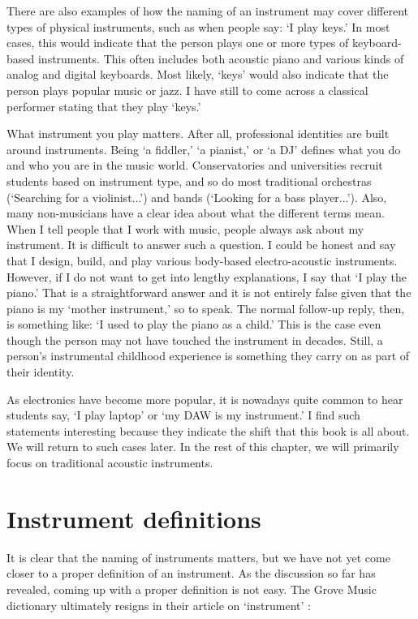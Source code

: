 There are also examples of how the naming of an instrument may cover different types of physical instruments, such as when people say: `I play keys.' In most cases, this would indicate that the person plays one or more types of keyboard-based instruments. This often includes both acoustic piano and various kinds of analog and digital keyboards. Most likely, `keys' would also indicate that the person plays popular music or jazz. I have still to come across a classical performer stating that they play `keys.'

What instrument you play matters. After all, professional identities are built around instruments. Being `a fiddler,' `a pianist,' or `a DJ' defines what you do and who you are in the music world. Conservatories and universities recruit students based on instrument type, and so do most traditional orchestras (`Searching for a violinist...') and bands (`Looking for a bass player...'). Also, many non-musicians have a clear idea about what the different terms mean.
When I tell people that I work with music, people always ask about my instrument. It is difficult to answer such a question. I could be honest and say that I design, build, and play various body-based electro-acoustic instruments. However, if I do not want to get into lengthy explanations, I say that `I play the piano.' That is a straightforward answer and it is not entirely false given that the piano is my `mother instrument,' so to speak. The normal follow-up reply, then, is something like: `I used to play the piano as a child.' This is the case even though the person may not have touched the instrument in decades. Still, a person's instrumental childhood experience is something they carry on as part of their identity.

As electronics have become more popular, it is nowadays quite common to hear students say, `I play laptop' or `my DAW is my instrument.' I find such statements interesting because they indicate the shift that this book is all about. We will return to such cases later. In the rest of this chapter, we will primarily focus on traditional acoustic instruments.


\section{Instrument definitions}

It is clear that the naming of instruments matters, but we have not yet come closer to a proper definition of an instrument. As the discussion so far has revealed, coming up with a proper definition is not easy. The Grove Music dictionary ultimately resigns in their article on `instrument' \citep{brown_instrument_2001}:

